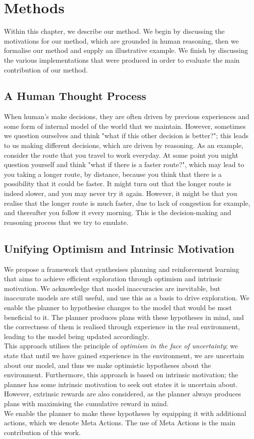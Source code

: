 \chapter{Methods}
\label{chapter3}
Within this chapter, we describe our method. We begin by discussing the motivations for our method, which are grounded in human reasoning, then we formalise our method and supply an illustrative example. We finish by discussing the various implementations that were produced in order to evaluate the main contribution of our method.

\section{A Human Thought Process}
When human's make decisions, they are often driven by previous experiences and some form of internal model of the world that we maintain. However, sometimes we question ourselves and think "what if this other decision is better?"; this leads to us making different decisions, which are driven by reasoning. As an example, consider the route that you travel to work everyday. At some point you might question yourself and think "what if there is a faster route?", which may lead to you taking a longer route, by distance, because you think that there is a possibility that it could be faster. It might turn out that the longer route is indeed slower, and you may never try it again. However, it might be that you realise that the longer route is much faster, due to lack of congestion for example, and thereafter you follow it every morning. This is the decision-making and reasoning process that we try to emulate.
\section{Unifying Optimism and Intrinsic Motivation}
We propose a framework that synthesises planning and reinforcement learning that aims to achieve efficient exploration through optimism and intrinsic motivation. We acknowledge that model inaccuracies are inevitable, but inaccurate models are still useful, and use this as a basis to drive exploration. We enable the planner to hypothesise changes to the model that would be most beneficial to it. The planner produces plans with these hypotheses in mind, and the correctness of them is realised through experience in the real environment, leading to the model being updated accordingly.
\\This approach utilises the principle of \textit{optimism in the face of uncertainty}; we state that until we have gained experience in the environment, we are uncertain about our model, and thus we make optimistic hypotheses about the environment. Furthermore, this approach is based on intrinsic motivation; the planner has some intrinsic motivation to seek out states it is uncertain about. However, extrinsic rewards are also considered, as the planner always produces plans with maximising the cumulative reward in mind.
\\We enable the planner to make these hypotheses by equipping it with additional actions, which we denote Meta Actions. The use of Meta Actions is the main contribution of this work.


